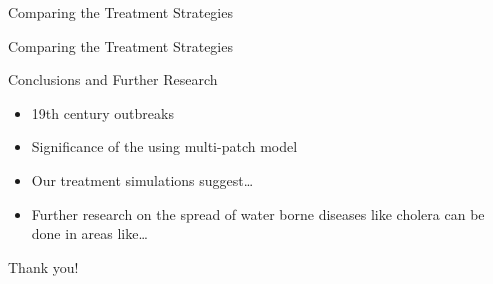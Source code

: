 \documentclass{beamer}\usepackage[]{graphicx}\usepackage[]{color}
\begin{document}
\begin{frame}{Comparing the Treatment Strategies}

\end{frame}

\begin{frame}{Comparing the Treatment Strategies}

\end{frame}

\begin{frame}{Conclusions and Further Research}
\begin{itemize}
\setlength\itemsep{2em}
\item 19th century outbreaks
\item Significance of the using multi-patch model
\item Our treatment simulations suggest…
\item Further research on the spread of water borne diseases like cholera can be done in areas like…
\end{itemize}
\end{frame}

\begin{frame}
\begin{center}
{\huge Thank you!}
\end{center}
\end{frame}
\end{document}
